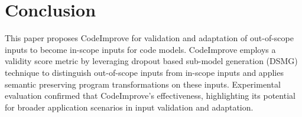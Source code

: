 \section{Conclusion}
\label{conclusion}
\vspace{-1mm}
This paper proposes CodeImprove for validation and adaptation of out-of-scope inputs to become in-scope inputs for code models. CodeImprove employs a validity score metric by leveraging dropout based sub-model generation (DSMG) technique to distinguish out-of-scope inputs from in-scope inputs and applies semantic preserving program transformations on these inputs. Experimental evaluation confirmed that CodeImprove's effectiveness, highlighting its potential for broader application scenarios in input validation and adaptation. 


